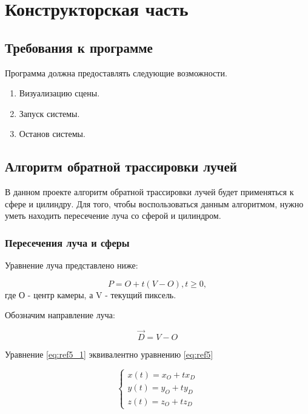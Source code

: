 \chapter{Конструкторская часть}
\label{cha:design}

\section{Требования к программе}

Программа должна предоставлять следующие возможности.

\begin{enumerate}
	\item Визуализацию сцены.
	\item Запуск системы.
	\item Останов системы.
\end{enumerate}

\section{Алгоритм обратной трассировки лучей}

В данном проекте алгоритм обратной трассировки лучей будет применяться к сфере и цилиндру.
Для того, чтобы воспользоваться данным алгоритмом, нужно уметь находить пересечение луча со сферой и цилиндром.

\subsection {Пересечения луча и сферы}

Уравнение луча представлено ниже:

\begin{equation}
	P = O + t(V - O), t \geq 0,
	\label{eq:ref5}
\end{equation}
где О - центр камеры, а V - текущий пиксель.

Обозначим направление луча:

\begin{equation}
	\overrightarrow{D} = V - O
\end{equation}

Уравнение \eqref{eq:ref5_1} эквивалентно уравнению \eqref{eq:ref5}

\begin{equation}
	{\begin{cases}
			x(t) = x_O + t x_D \\
			y(t) = y_O + t y_D \\
			z(t) = z_O + t z_D
			\label{eq:ref5_1}
		\end{cases}}
\end{equation}

